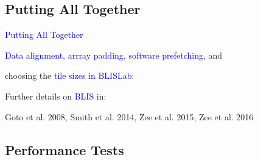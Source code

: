 \documentclass[11pt]{beamer}
\begin{document}
\subsection{Putting All Together}

\begin{frame}{\textcolor{blue}{Putting All Together}}

\textcolor{blue}{Data alignment}, \textcolor{blue}{arrray padding}, \textcolor{blue}{software prefetching}, and 

\qquad\qquad choosing the \textcolor{blue}{tile sizes in BLISLab}:

\vspace{-0.2cm}


\begin{small}
\begin{figure}
    \centering
    \def\svgwidth{0.9\columnwidth}
    
\end{figure}
\end{small}

\vspace{0.1cm}

Further details on \textcolor{blue}{BLIS} in:

\qquad Goto et al. 2008, Smith et al. 2014, Zee et al. 2015, Zee et al. 2016 

\end{frame}

\subsection{Performance Tests}
\end{document}
